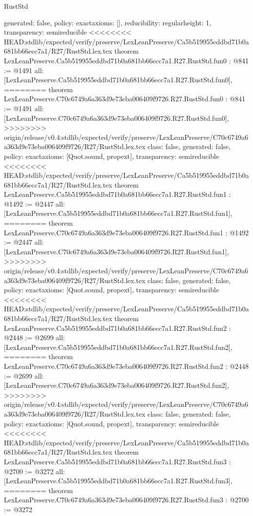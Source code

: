 \begin{lexlean}{RustStd}
\begin{coremodule}
{\begin{coremodule}
{{{  generated: false,
  policy: exact{axioms: []},
  reducibility: regular{height: 1},
  transparency: semireducible
}
<<<<<<<< HEAD:stdlib/expected/verify/preserve/LexLeanPreserve/Ca5b519955eddbd71b0a681bb66ecc7a1/R27/RustStd.lex.tex
theorem LexLeanPreserve.Ca5b519955eddbd71b0a681bb66ecc7a1.R27.RustStd.fun0 : @841 := @1491 {
  all: [LexLeanPreserve.Ca5b519955eddbd71b0a681bb66ecc7a1.R27.RustStd.fun0],
========
theorem LexLeanPreserve.C70c6749a6a363d9e73eba006409f9726.R27.RustStd.fun0 : @841 := @1491 {
  all: [LexLeanPreserve.C70c6749a6a363d9e73eba006409f9726.R27.RustStd.fun0],
>>>>>>>> origin/release/v0.4:stdlib/expected/verify/preserve/LexLeanPreserve/C70c6749a6a363d9e73eba006409f9726/R27/RustStd.lex.tex
  class: false,
  generated: false,
  policy: exact{axioms: [Quot.sound, propext]},
  transparency: semireducible
}
<<<<<<<< HEAD:stdlib/expected/verify/preserve/LexLeanPreserve/Ca5b519955eddbd71b0a681bb66ecc7a1/R27/RustStd.lex.tex
theorem LexLeanPreserve.Ca5b519955eddbd71b0a681bb66ecc7a1.R27.RustStd.fun1 : @1492 := @2447 {
  all: [LexLeanPreserve.Ca5b519955eddbd71b0a681bb66ecc7a1.R27.RustStd.fun1],
========
theorem LexLeanPreserve.C70c6749a6a363d9e73eba006409f9726.R27.RustStd.fun1 : @1492 := @2447 {
  all: [LexLeanPreserve.C70c6749a6a363d9e73eba006409f9726.R27.RustStd.fun1],
>>>>>>>> origin/release/v0.4:stdlib/expected/verify/preserve/LexLeanPreserve/C70c6749a6a363d9e73eba006409f9726/R27/RustStd.lex.tex
  class: false,
  generated: false,
  policy: exact{axioms: [Quot.sound, propext]},
  transparency: semireducible
}
<<<<<<<< HEAD:stdlib/expected/verify/preserve/LexLeanPreserve/Ca5b519955eddbd71b0a681bb66ecc7a1/R27/RustStd.lex.tex
theorem LexLeanPreserve.Ca5b519955eddbd71b0a681bb66ecc7a1.R27.RustStd.fun2 : @2448 := @2699 {
  all: [LexLeanPreserve.Ca5b519955eddbd71b0a681bb66ecc7a1.R27.RustStd.fun2],
========
theorem LexLeanPreserve.C70c6749a6a363d9e73eba006409f9726.R27.RustStd.fun2 : @2448 := @2699 {
  all: [LexLeanPreserve.C70c6749a6a363d9e73eba006409f9726.R27.RustStd.fun2],
>>>>>>>> origin/release/v0.4:stdlib/expected/verify/preserve/LexLeanPreserve/C70c6749a6a363d9e73eba006409f9726/R27/RustStd.lex.tex
  class: false,
  generated: false,
  policy: exact{axioms: [Quot.sound, propext]},
  transparency: semireducible
}
<<<<<<<< HEAD:stdlib/expected/verify/preserve/LexLeanPreserve/Ca5b519955eddbd71b0a681bb66ecc7a1/R27/RustStd.lex.tex
theorem LexLeanPreserve.Ca5b519955eddbd71b0a681bb66ecc7a1.R27.RustStd.fun3 : @2700 := @3272 {
  all: [LexLeanPreserve.Ca5b519955eddbd71b0a681bb66ecc7a1.R27.RustStd.fun3],
========
theorem LexLeanPreserve.C70c6749a6a363d9e73eba006409f9726.R27.RustStd.fun3 : @2700 := @3272 {
}}}}}}}
\end{coremodule}}
\end{coremodule}
\end{lexlean}
